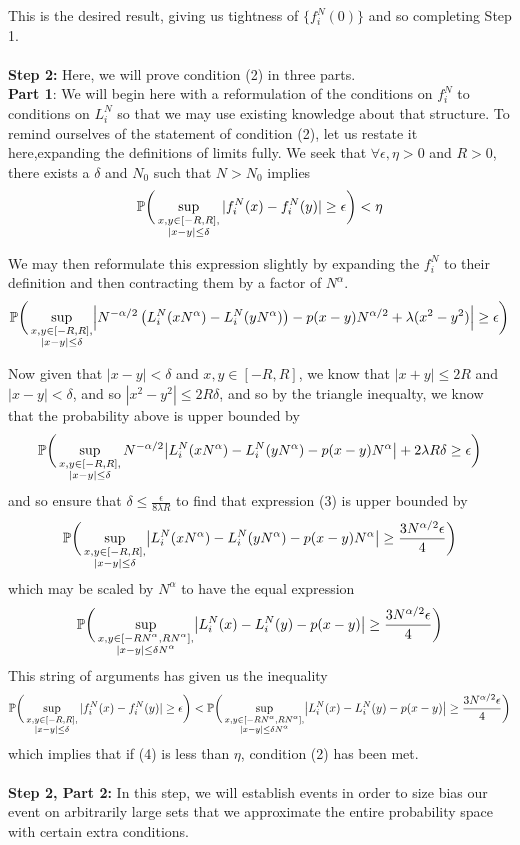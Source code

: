 	This is the desired result, giving us tightness of $\{f_i^N(0)\}$ and so completing Step 1.\\\\\noindent
	\textbf{Step 2:} Here, we will prove condition (2) in three parts.\\
	\textbf{Part 1}: 
	We will begin here with a reformulation of the conditions on $f_i^N$ to conditions on $L_i^N$ so that we may use existing knowledge about that structure. To remind ourselves of the statement of condition (2), let us restate it here,expanding the definitions of limits fully. We seek that $\forall \epsilon,\eta>0$ and $R>0$, there exists a $\delta$ and $N_0$ such that $N>N_0$ implies 
	\[
	\mathbb{P}\bigg(\sup_{\substack{x,y\in [-R,R],\\ |x-y|\leq\delta}} |f^N_i(x) - f^N_i(y)| \geq \epsilon\bigg)<\eta
	\]
	
	We may then reformulate this expression slightly by expanding the $f_i^N$ to their definition and then contracting them by a factor of $N^\alpha$. 
	\begin{align}
	\pr\bigg(\sup_{\substack{x,y\in [-R,R],\\ |x-y|\leq\delta}} \abs*{N^{-\alpha/2}\left(L^N_i(xN^{\alpha}) - L^N_i(yN^\alpha)\right)-p(x-y)N^{\alpha/2}+\lambda(x^2-y^2)} \geq \epsilon\bigg)
	\end{align}
	
	Now given that $|x-y|<\delta$ and $x,y\in [-R,R]$, we know that $|x+y|\leq 2R$ and $|x-y|<\delta$, and so $|x^2-y^2|\leq 2R\delta$, and so by the triangle inequalty, we know that the probability above is upper bounded by 
	\[
	\pr\bigg(\sup_{\substack{x,y\in [-R,R],\\ |x-y|\leq\delta}} N^{-\alpha/2}\abs*{L_i^N(xN^\alpha)-L_i^N(yN^\alpha)-p(x-y)N^\alpha}+2\lambda R\delta\geq \epsilon\bigg)
	\]
	and so ensure that $\delta\leq \frac{\epsilon}{8\lambda R}$ to find that expression (3) is upper bounded by 
	\[
	\pr\bigg(\sup_{\substack{x,y\in [-R,R],\\ |x-y|\leq\delta}} \abs*{L_i^N(xN^\alpha)-L_i^N(yN^\alpha)-p(x-y)N^\alpha}\geq \frac{3N^{\alpha/2}\epsilon}4\bigg)
	\]
	which may be scaled by $N^\alpha$ to have the equal expression
	\begin{align}
	\pr\bigg(\sup_{\substack{x,y\in [-RN^\alpha,RN^\alpha],\\ |x-y|\leq \delta N^\alpha}} \abs*{L_i^N(x)-L_i^N(y)-p(x-y)}\geq \frac{3N^{\alpha/2}\epsilon}4\bigg)
	\end{align}
	This string of arguments has given us the inequality 
	\[
	\pr\bigg(\sup_{\substack{x,y\in [-R,R],\\ |x-y|\leq\delta}} |f^N_i(x) - f^N_i(y)| \geq \epsilon\bigg)<\pr\bigg(\sup_{\substack{x,y\in [-RN^\alpha,RN^\alpha],\\ |x-y|\leq \delta N^\alpha}} \abs*{L_i^N(x)-L_i^N(y)-p(x-y)}\geq \frac{3N^{\alpha/2}\epsilon}4\bigg)
	\]
	which implies that if (4) is less than $\eta$, condition (2) has been met. 
	\\\\\noindent \textbf{Step 2, Part 2:} In this step, we will establish events in order to size bias our event on arbitrarily large sets that we approximate the entire probability space with certain extra conditions.
	
